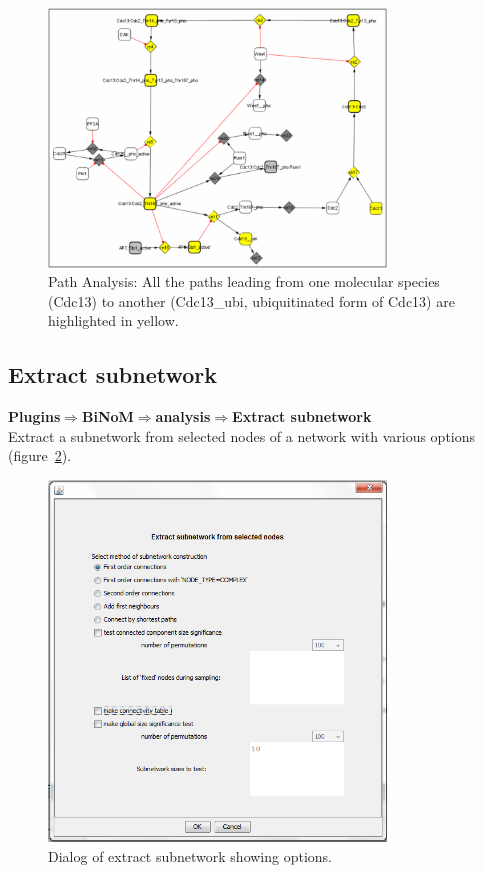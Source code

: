 \begin{figure}
\centering
\includegraphics[width=0.8\textwidth]{graphics/Path_Analysis_All_the_paths}
\caption{Path Analysis: All the paths leading from one molecular species (Cdc13) to another (Cdc13\_ubi, ubiquitinated form of Cdc13) are highlighted in yellow.}
\label{Path_Analysis_All_the_paths}
\end{figure}

\subsection{Extract subnetwork}
\textbf{Plugins$\Rightarrow$BiNoM$\Rightarrow$analysis$\Rightarrow$Extract subnetwork}\\
Extract a subnetwork from selected nodes of a network with various options (figure~\ref{Extract_subnetwork_dialog}).
\begin{figure}
\centering
\includegraphics[width=0.8\textwidth]{graphics/Extract_subnetwork_dialog}
\caption{Dialog of extract subnetwork showing options.}
\label{Extract_subnetwork_dialog}
\end{figure}

